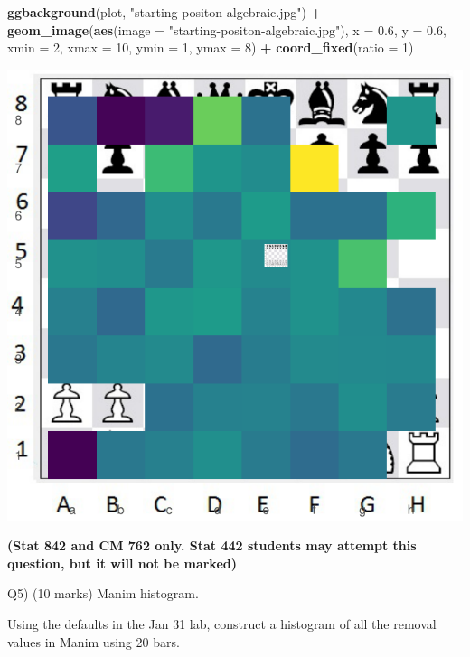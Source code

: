 \documentclass[
]{article}
\newenvironment{Shaded}{\begin{snugshade}}{\end{snugshade}}
\newcommand{\AttributeTok}[1]{\textcolor[rgb]{0.13,0.29,0.53}{#1}}
\newcommand{\DecValTok}[1]{\textcolor[rgb]{0.00,0.00,0.81}{#1}}
\newcommand{\FloatTok}[1]{\textcolor[rgb]{0.00,0.00,0.81}{#1}}
\newcommand{\FunctionTok}[1]{\textcolor[rgb]{0.13,0.29,0.53}{\textbf{#1}}}
\newcommand{\NormalTok}[1]{#1}
\newcommand{\SpecialCharTok}[1]{\textcolor[rgb]{0.81,0.36,0.00}{\textbf{#1}}}
\newcommand{\StringTok}[1]{\textcolor[rgb]{0.31,0.60,0.02}{#1}}
\begin{document}
\begin{Shaded}
\begin{Highlighting}[]
\FunctionTok{ggbackground}\NormalTok{(plot, }\StringTok{"starting{-}positon{-}algebraic.jpg"}\NormalTok{) }\SpecialCharTok{+}
  \FunctionTok{geom\_image}\NormalTok{(}\FunctionTok{aes}\NormalTok{(}\AttributeTok{image =} \StringTok{"starting{-}positon{-}algebraic.jpg"}\NormalTok{), }
             \AttributeTok{x =} \FloatTok{0.6}\NormalTok{, }\AttributeTok{y =} \FloatTok{0.6}\NormalTok{, }
             \AttributeTok{xmin =} \DecValTok{2}\NormalTok{, }\AttributeTok{xmax =} \DecValTok{10}\NormalTok{, }\AttributeTok{ymin =} \DecValTok{1}\NormalTok{, }\AttributeTok{ymax =} \DecValTok{8}\NormalTok{) }\SpecialCharTok{+}
  \FunctionTok{coord\_fixed}\NormalTok{(}\AttributeTok{ratio =} \DecValTok{1}\NormalTok{) }
\end{Highlighting}
\end{Shaded}

\includegraphics{STAT842_Assignment2_files/figure-latex/unnamed-chunk-6-1.pdf}

\newpage

\textbf{(Stat 842 and CM 762 only. Stat 442 students may attempt this
question, but it will not be marked)}

Q5) (10 marks) Manim histogram.

Using the defaults in the Jan 31 lab, construct a histogram of all the
removal values in Manim using 20 bars.
\end{document}
